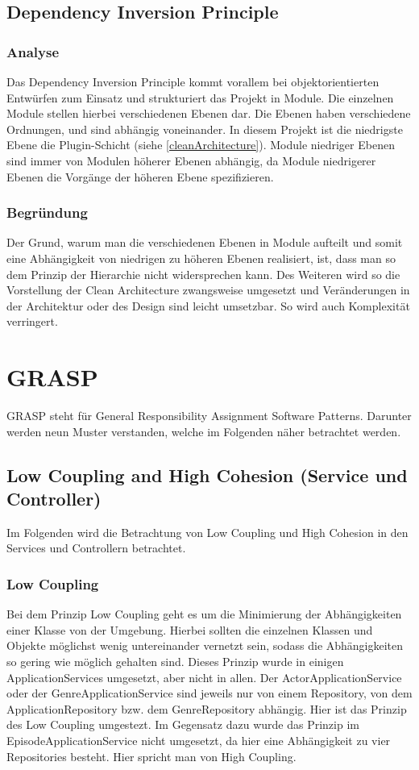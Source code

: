 \subsection{Dependency Inversion Principle}

        \subsubsection{Analyse}
        Das Dependency Inversion Principle kommt vorallem bei objektorientierten Entwürfen zum Einsatz und strukturiert das Projekt in Module. Die einzelnen Module stellen hierbei verschiedenen Ebenen dar. Die Ebenen haben verschiedene Ordnungen, und sind abhängig voneinander. In diesem Projekt ist die niedrigste Ebene die Plugin-Schicht (siehe \cref{cleanArchitecture}). Module niedriger Ebenen sind immer von Modulen höherer Ebenen abhängig, da Module niedrigerer Ebenen die Vorgänge der höheren Ebene spezifizieren.
        
        \subsubsection{Begründung}
        Der Grund, warum man die verschiedenen Ebenen in Module aufteilt und somit eine Abhängigkeit von niedrigen zu höheren Ebenen realisiert, ist, dass man so dem Prinzip der Hierarchie nicht widersprechen kann. Des Weiteren wird so die Vorstellung der Clean Architecture zwangsweise umgesetzt und Veränderungen in der Architektur oder des Design sind leicht umsetzbar. So wird auch Komplexität verringert.

\section{GRASP}
GRASP steht für General Responsibility Assignment Software Patterns. Darunter werden neun Muster verstanden, welche im Folgenden näher betrachtet werden.

	\subsection{Low Coupling and High Cohesion (Service und Controller)}
	Im Folgenden wird die Betrachtung von Low Coupling und High Cohesion in den Services und Controllern betrachtet.
		\subsubsection{Low Coupling}
			Bei dem Prinzip Low Coupling geht es um die Minimierung der Abhängigkeiten einer Klasse von der Umgebung. Hierbei sollten die einzelnen Klassen und Objekte möglichst wenig untereinander vernetzt sein, sodass die Abhängigkeiten so gering wie möglich gehalten sind. Dieses Prinzip wurde in einigen ApplicationServices umgesetzt, aber nicht in allen. Der ActorApplicationService oder der GenreApplicationService sind jeweils nur von einem Repository, von dem ApplicationRepository bzw. dem GenreRepository abhängig. Hier ist das Prinzip des Low Coupling umgestezt. Im Gegensatz dazu wurde das Prinzip im EpisodeApplicationService nicht umgesetzt, da hier eine Abhängigkeit zu vier Repositories besteht. Hier spricht man von High Coupling.
			
